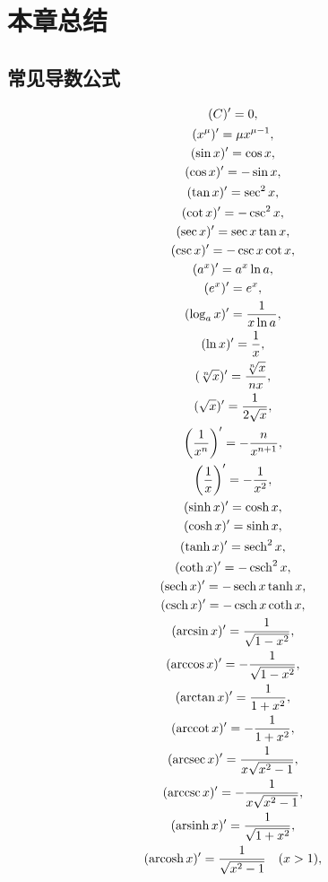 \section{本章总结}
\subsection{常见导数公式}
\begin{gather*}
	(C)' = 0, \\
	(x^\mu)' = \mu x^{\mu-1}, \\
	(\sin x)' = \cos x, \\
	(\cos x)' = - \sin x, \\
	(\tan x)' = \sec^2 x, \\
	(\cot x)' = - \csc^2 x, \\
	(\sec x)' = \sec x \tan x, \\
	(\csc x)' = - \csc x \cot x, \\
	(a^x)' = a^x \ln a, \\
	(e^x)' = e^x, \\
	(\log_a x)' = \frac{1}{x \ln a}, \\
	(\ln x)' = \frac{1}{x}, \\
	(\sqrt[n]{x})' = \frac{\sqrt[n]{x}}{n x}, \\
	(\sqrt{x})' = \frac{1}{2\sqrt{x}}, \\
	\left(\frac{1}{x^n}\right)' = -\frac{n}{x^{n+1}}, \\
	\left(\frac{1}{x}\right)' = -\frac{1}{x^2}, \\
	(\sinh x)' = \cosh x, \\
	(\cosh x)' = \sinh x, \\
	(\tanh x)' = \sech^2 x, \\
	(\coth x)' = -\csch^2 x, \\
	(\sech x)' = -\sech x \tanh x, \\
	(\csch x)' = -\csch x \coth x, \\
	(\arcsin x)' = \frac{1}{\sqrt{1 - x^2}}, \\
	(\arccos x)' = - \frac{1}{\sqrt{1 - x^2}}, \\
	(\arctan x)' = \frac{1}{1 + x^2}, \\
	(\arccot x)' = - \frac{1}{1 + x^2}, \\
	(\arcsec x)' = \frac{1}{x \sqrt{x^2-1}}, \\
	(\arccsc x)' = -\frac{1}{x \sqrt{x^2-1}}, \\
	(\arsinh x)' = \frac{1}{\sqrt{1 + x^2}}, \\
	(\arcosh x)' = \frac{1}{\sqrt{x^2 - 1}} \quad (x > 1), \\

\end{gather*}
